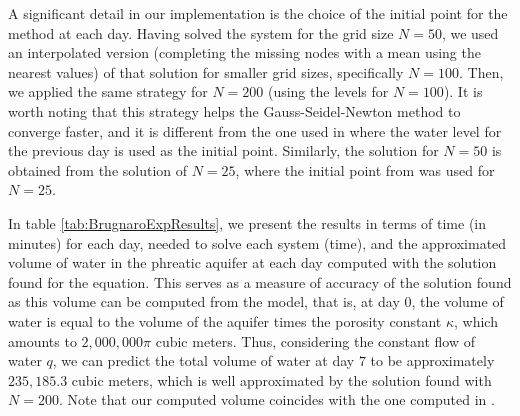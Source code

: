 \documentclass[11pt]{article}
\begin{document}
A significant detail in our implementation is the choice of the initial point for the method at each day. Having solved the system for the grid size $N=50$, we used an interpolated version (completing the missing nodes with a mean using the nearest values) of that solution for smaller grid sizes, specifically $N=100$. Then, we applied the same strategy for $N=200$ (using the levels for $N=100$). It is worth noting that this strategy helps the Gauss-Seidel-Newton method to converge faster, and it is different from the one used in \cite{Brugnano2008} where the water level for the previous day is used as the initial point. Similarly, the solution for $N=50$ is obtained from the solution of $N=25$, where the initial point from \cite{Brugnano2008} was used for $N=25$.

In table \ref{tab:BrugnaroExpResults}, we present the results in terms of time (in minutes) for each day, needed to solve each system (time), and the approximated volume of water in the phreatic aquifer at each day computed with the solution found for the equation. This serves as a measure of accuracy of the solution found as this volume can be computed from the model, that is, at day $0$, the volume of water is equal to the volume of the aquifer times the porosity constant $\kappa$, which amounts to $2,000,000\pi$ cubic meters. Thus, considering the constant flow of water $q$, we can predict the total volume of water at day $7$ to be approximately $235,185.3$ cubic meters, which is well approximated by the solution found with $N=200$. Note that our computed volume coincides with the one computed in \cite{Brugnano2008}.
\end{document}
